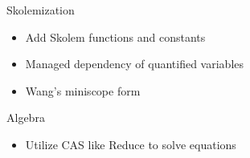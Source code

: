 \documentclass{beamer}
\begin{document}
\begin{frame}{Skolemization}
\begin{itemize}
\item Add Skolem functions and constants
\item Managed dependency of quantified variables
\item Wang's miniscope form
\end{itemize}
\end{frame}

\begin{frame}{Algebra}
\begin{itemize}
\item Utilize CAS like Reduce to solve equations
\end{itemize}
\end{frame}
\end{document}
